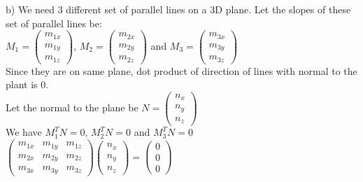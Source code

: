\documentclass{article}
\renewcommand{\section}\large{}
\begin{document}
	\section{\huge{b)}}
	We need 3 different set of parallel lines on a 3D plane. Let the slopes of these set of parallel lines be:
	\\
	\begin{math}M_1 = \begin{pmatrix}m_{1x} \\m_{1y} \\m_{1z}\end{pmatrix}\end{math}, 
	\begin{math}M_2 = \begin{pmatrix}m_{2x} \\m_{2y} \\m_{2z}\end{pmatrix}\end{math} and 
	\begin{math}M_3 = \begin{pmatrix}m_{3x} \\m_{3y} \\m_{3z}\end{pmatrix}\end{math}
	\\
	Since they are on same plane, dot product of direction of lines with normal to the plant is 0.
	\\
	Let the normal to the plane be \begin{math}N = \begin{pmatrix}n_x\\n_y\\n_z\end{pmatrix}\end{math}
	\\
	We have \begin{math}M_1^TN=0\end{math}, \begin{math}M_2^TN=0\end{math} and \begin{math}M_3^TN=0\end{math}
	\\
	\begin{math}\begin{pmatrix}m_{1x}&m_{1y}&m_{1z}\\m_{2x}&m_{2y}&m_{2z}\\m_{3x}&m_{3y}&m_{3z}\end{pmatrix}\begin{pmatrix}n_x\\n_y\\n_z\end{pmatrix} = \begin{pmatrix}0\\0\\0\end{pmatrix}\end{math}
\end{document}
